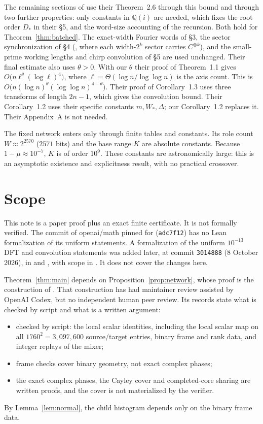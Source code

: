 \documentclass[11pt]{article}
\theoremstyle{definition}
\begin{document}
The remaining sections of \cite{oai-dft} use their Theorem~2.6 through this
bound and through two further properties: only constants in $\mathbb Q(i)$ are
needed, which fixes the root order $D_*$ in their \S5, and the word-size
accounting of the recursion. Both hold for Theorem~\ref{thm:batched}. The
exact-width Fourier words of \S3, the sector synchronization of \S4
(\cite[Proposition~4.2]{oai-dft}, where each width-$2^k$ sector carries
$C^{\otimes k}$), and
the small-prime working lengths and chirp convolution of \S5 are used
unchanged. Their final estimate also uses $\theta>0$. With our $\theta$ their
proof of Theorem~1.1 gives $O\bigl(n\ell^\theta(\log\ell)^4\bigr)$, where
$\ell=\Theta(\log n/\log\log n)$ is the axis count. This is
$O\bigl(n(\log n)^\theta(\log\log n)^{4-\theta}\bigr)$. Their proof of
Corollary~1.3 uses three transforms of length $2n-1$, which gives the
convolution bound. Their Corollary~1.2 uses their specific constants
$m,W_*,\Delta$; our Corollary~1.2 replaces it. Their Appendix~A is not needed.

The fixed network enters only through finite tables and constants. Its role
count $W\approx2^{2570}$ ($2571$ bits) and the base range $K$ are absolute
constants. Because $1-\mu\approx10^{-7}$, $K$ is of order $10^9$. These
constants are astronomically large: this is an asymptotic existence and
explicitness result, with no practical crossover.

\section{Scope}\label{sec:scope}
This note is a paper proof plus an exact finite certificate. It is not formally
verified. The commit of openai/math pinned for \cite{oai-dft}
(\texttt{adc7f12}) has no Lean formalization of its uniform statements. A
formalization of the uniform $10^{-13}$ DFT and convolution statements was
added later, at commit \texttt{3014888} (8 October 2026), in
 and
, with scope in
. It does not cover the changes here.

Theorem~\ref{thm:main} depends on Proposition~\ref{prop:network}, whose proof
is the construction of \cite{cms}. That construction has had maintainer review
assisted by OpenAI Codex, but no independent human peer review. Its records
state what is checked by script and what is a written argument:
\begin{itemize}
\item checked by script: the local scalar identities, including the local
  scalar map on all $1760^2=3{,}097{,}600$ source/target entries, binary frame
  and rank data, and integer replays of the mixer;
\item frame checks cover binary geometry, not exact complex phases;
\item the exact complex phases, the Cayley cover and completed-core sharing are
  written proofs, and the cover is not materialized by the verifier.
\end{itemize}
By Lemma~\ref{lem:normal}, the child histogram depends only on the binary frame
data.
\end{document}
